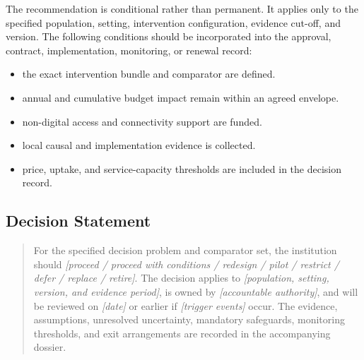 The recommendation is conditional rather than permanent. It applies only to the
specified population, setting, intervention configuration, evidence cut-off, and
version. The following conditions should be incorporated into the approval,
contract, implementation, monitoring, or renewal record:

\begin{itemize}
 \item the exact intervention bundle and comparator are defined.
 \item annual and cumulative budget impact remain within an agreed envelope.
 \item non-digital access and connectivity support are funded.
 \item local causal and implementation evidence is collected.
 \item price, uptake, and service-capacity thresholds are included in the decision record.
\end{itemize}

\subsection{Decision Statement}
\begin{quote}
For the specified decision problem and comparator set, the institution should
\emph{[proceed / proceed with conditions / redesign / pilot / restrict / defer /
replace / retire]}. The decision applies to \emph{[population, setting, version,
and evidence period]}, is owned by \emph{[accountable authority]}, and will be
reviewed on \emph{[date]} or earlier if \emph{[trigger events]} occur. The
evidence, assumptions, unresolved uncertainty, mandatory safeguards, monitoring
thresholds, and exit arrangements are recorded in the accompanying dossier.
\end{quote}
